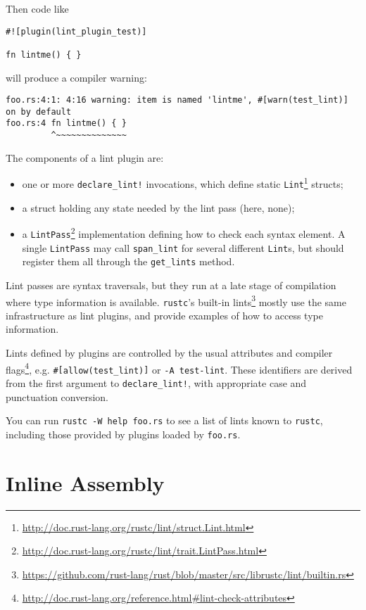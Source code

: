 \documentclass[a4paper,]{book}
\renewcommand{\href}[2]{#2\footnote{\url{#1}}}
\begin{document}
Then code like

\begin{verbatim}
#![plugin(lint_plugin_test)]

fn lintme() { }
\end{verbatim}

will produce a compiler warning:

\begin{verbatim}
foo.rs:4:1: 4:16 warning: item is named 'lintme', #[warn(test_lint)] on by default
foo.rs:4 fn lintme() { }
         ^~~~~~~~~~~~~~~
\end{verbatim}

The components of a lint plugin are:

\begin{itemize}
\item
  one or more \texttt{declare\_lint!} invocations, which define static
  \href{http://doc.rust-lang.org/rustc/lint/struct.Lint.html}{\texttt{Lint}}
  structs;
\item
  a struct holding any state needed by the lint pass (here, none);
\item
  a
  \href{http://doc.rust-lang.org/rustc/lint/trait.LintPass.html}{\texttt{LintPass}}
  implementation defining how to check each syntax element. A single
  \texttt{LintPass} may call \texttt{span\_lint} for several different
  \texttt{Lint}s, but should register them all through the
  \texttt{get\_lints} method.
\end{itemize}

Lint passes are syntax traversals, but they run at a late stage of
compilation where type information is available. \texttt{rustc}'s
\href{https://github.com/rust-lang/rust/blob/master/src/librustc/lint/builtin.rs}{built-in
lints} mostly use the same infrastructure as lint plugins, and provide
examples of how to access type information.

Lints defined by plugins are controlled by the usual
\href{http://doc.rust-lang.org/reference.html\#lint-check-attributes}{attributes
and compiler flags}, e.g. \texttt{\#{[}allow(test\_lint){]}} or
\texttt{-A\ test-lint}. These identifiers are derived from the first
argument to \texttt{declare\_lint!}, with appropriate case and
punctuation conversion.

You can run \texttt{rustc\ -W\ help\ foo.rs} to see a list of lints
known to \texttt{rustc}, including those provided by plugins loaded by
\texttt{foo.rs}.

\section{Inline Assembly}\label{sec--inline-assembly}
\end{document}
